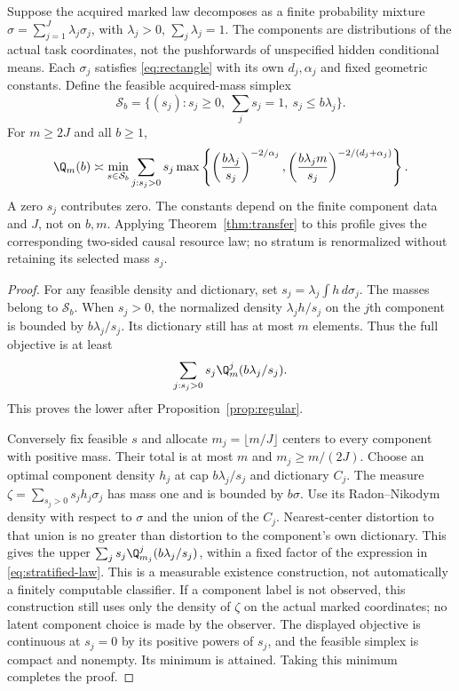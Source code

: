 \begin{theorem}\label{thm:stratified}
Suppose the acquired marked law decomposes as a finite probability mixture
$\sigma=\sum_{j=1}^J\lambda_j\sigma_j$, with $\lambda_j>0$, $\sum_j\lambda_j=1$. The components are distributions of the actual task coordinates, not the pushforwards of unspecified hidden conditional means. Each $\sigma_j$ satisfies \eqref{eq:rectangle} with its own $d_j,\alpha_j$ and fixed geometric constants. Define the feasible acquired-mass simplex
\[
 \mathcal S_b=\{(s_j):s_j\ge0,\ \sum_js_j=1,\ s_j\le b\lambda_j\}.
\]
For $m\ge2J$ and all $b\ge1$,
\begin{equation}\label{eq:stratified-law}
 \Q_m(b)\asymp\min_{s\in\mathcal S_b}
 \sum_{j:s_j>0}s_j
 \max\left\{
 \left(\frac{b\lambda_j}{s_j}\right)^{-2/\alpha_j},
 \left(\frac{b\lambda_jm}{s_j}\right)^{-2/(d_j+\alpha_j)}\right\}.
\end{equation}
A zero $s_j$ contributes zero. The constants depend on the finite component data and $J$, not on $b,m$. Applying Theorem~\ref{thm:transfer} to this profile gives the corresponding two-sided causal resource law; no stratum is renormalized without retaining its selected mass $s_j$.
\end{theorem}
\begin{proof}
For any feasible density and dictionary, set $s_j=\lambda_j\int h\,d\sigma_j$. The masses belong to $\mathcal S_b$. When $s_j>0$, the normalized density $\lambda_jh/s_j$ on the $j$th component is bounded by $b\lambda_j/s_j$. Its dictionary still has at most $m$ elements. Thus the full objective is at least
\[
 \sum_{j:s_j>0}s_j\Q_m^j(b\lambda_j/s_j).
\]
This proves the lower after Proposition~\ref{prop:regular}.

Conversely fix feasible $s$ and allocate $m_j=\lfloor m/J\rfloor$ centers to every component with positive mass. Their total is at most $m$ and $m_j\ge m/(2J)$. Choose an optimal component density $h_j$ at cap $b\lambda_j/s_j$ and dictionary $C_j$. The measure $\zeta=\sum_{s_j>0}s_jh_j\sigma_j$ has mass one and is bounded by $b\sigma$. Use its Radon--Nikodym density with respect to $\sigma$ and the union of the $C_j$. Nearest-center distortion to that union is no greater than distortion to the component's own dictionary. This gives the upper $\sum_js_j\Q_{m_j}^j(b\lambda_j/s_j)$, within a fixed factor of the expression in \eqref{eq:stratified-law}. This is a measurable existence construction, not automatically a finitely computable classifier. If a component label is not observed, this construction still uses only the density of $\zeta$ on the actual marked coordinates; no latent component choice is made by the observer. The displayed objective is continuous at $s_j=0$ by its positive powers of $s_j$, and the feasible simplex is compact and nonempty. Its minimum is attained. Taking this minimum completes the proof.
\end{proof}

